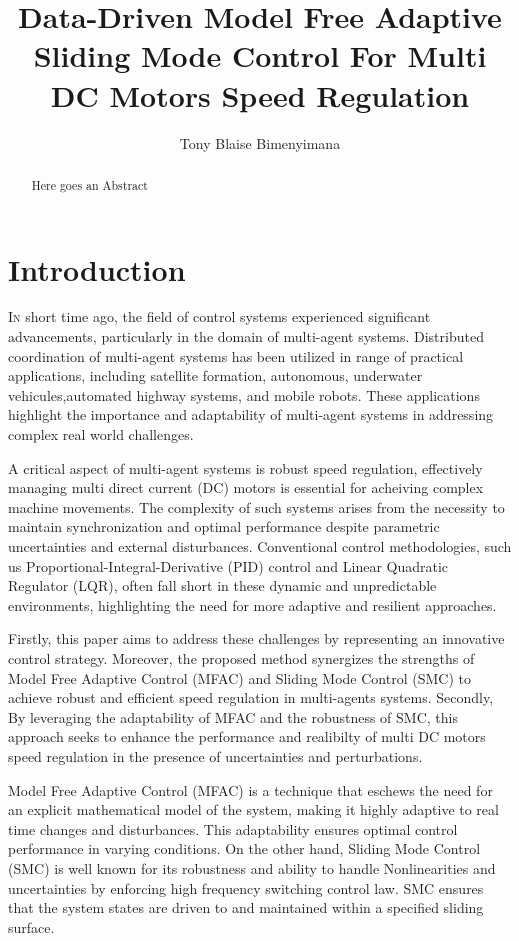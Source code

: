 \documentclass[journal,onecolumn]{IEEEtran}
\title{\LARGE Data-Driven Model Free Adaptive Sliding Mode Control For Multi DC Motors Speed Regulation}
\author{Tony Blaise Bimenyimana}
\begin{document}
\maketitle


\begin{abstract}
    Here goes an Abstract
\end{abstract}

\section{Introduction}\label{section:1}

    \lettrine{I}n short time ago, the field of control systems experienced significant advancements, particularly in the domain of multi-agent systems. Distributed coordination of multi-agent systems has been utilized in range of practical applications, including satellite formation, autonomous, underwater vehicules,automated highway systems, and mobile robots. These applications highlight the importance and adaptability of multi-agent systems in addressing complex real world challenges.

    A critical aspect of multi-agent systems is robust speed regulation, effectively managing multi direct current (DC) motors is essential for acheiving complex machine movements. The complexity of such systems arises from the necessity to maintain synchronization and optimal performance despite parametric uncertainties and external disturbances. Conventional control methodologies, such us Proportional-Integral-Derivative (PID) control and Linear Quadratic Regulator (LQR), often fall short in these dynamic and unpredictable environments, highlighting the need for more adaptive and resilient approaches.

    Firstly, this paper aims to address these challenges by representing an innovative control strategy. Moreover, the proposed method synergizes the strengths of Model Free Adaptive Control (MFAC) and Sliding Mode Control (SMC) to achieve robust and efficient speed regulation in multi-agents systems. Secondly, By leveraging the adaptability of MFAC and the robustness of SMC, this approach seeks to enhance the performance and realibilty of multi DC motors speed regulation in the presence of uncertainties and perturbations.

    Model Free Adaptive Control (MFAC) is a technique that eschews the need for an explicit mathematical model of the system, making it highly adaptive to real time changes and disturbances. This adaptability ensures optimal control performance in varying conditions. On the other hand, Sliding Mode Control (SMC) is well known for its robustness and ability to handle Nonlinearities and uncertainties by enforcing high frequency switching control law. SMC ensures that the system states are driven to and maintained within a specified sliding surface.
\end{document}
